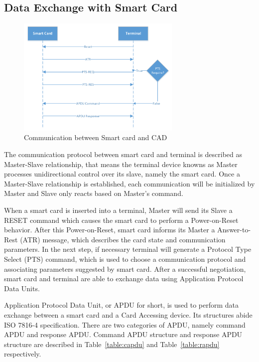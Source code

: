 \subsection{Data Exchange with Smart Card}

\begin{figure}[!htbp]
	\centering
	\includegraphics[width=0.7\textwidth]{master-slave-relationship}
		\caption{Communication between Smart card and CAD\cite{handbuch}}
	\label{fig:master-slave-relationship}
\end{figure}
The communication protocol between smart card and terminal is described as Master-Slave relationship\cite{handbuch}, that means the terminal device knowns as Master processes unidirectional control over its slave, namely the smart card. Once a Master-Slave relationship is established, each communication will be initialized by Master and Slave only reacts based on Master's command. 

When a smart card is inserted into a terminal, Master will send its Slave a RESET command which causes the smart card to perform a Power-on-Reset behavior. After this Power-on-Reset, smart card informs its Master a Answer-to-Rest (ATR) message, which describes the card state and communication parameters. In the next step, if necessary terminal will generate a Protocol Type Select (PTS) command, which is used to choose a communication protocol and associating parameters suggested by smart card. After a successful negotiation, smart card and terminal are able to exchange data using Application Protocol Data Units.
  
Application Protocol Data Unit, or APDU for short, is used  to perform data exchange between a smart card and a Card Accessing device.  Its structures abide ISO 7816-4 specification\cite{chen}. There are two categories of APDU, namely command APDU and response APDU. Command APDU structure and response APDU structure are described in Table~\ref{table:capdu} and Table~\ref{table:rapdu} respectively\cite{handbuch}. 

